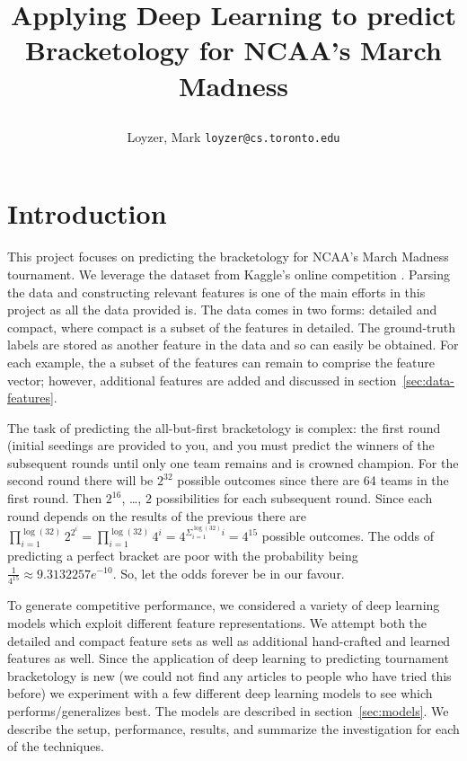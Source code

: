 \documentclass{article} %
\begin{document}
\title{Applying Deep Learning to predict Bracketology for NCAA's March Madness
\author{Loyzer, Mark \texttt{loyzer@cs.toronto.edu}}
}





\newcommand{\fix}{\marginpar{FIX}}
\newcommand{\new}{\marginpar{NEW}}


\maketitle

\section{Introduction}
This project focuses on predicting the bracketology for NCAA's March Madness tournament.  We leverage the dataset from Kaggle's online competition \citep{kagglecompetition}.  Parsing the data and constructing relevant features is one of the main efforts in this project as all the data provided is.  The data comes in two forms: detailed and compact, where compact is a subset of the features in detailed.  The ground-truth labels are stored as another feature in the data and so can easily be obtained.  For each example, the a subset of the features can remain to comprise the feature vector; however, additional features are added and discussed in section~\ref{sec:data-features}.


The task of predicting the all-but-first bracketology is complex: the first round (initial seedings are provided to you, and you must predict the winners of the subsequent rounds until only one team remains and is crowned champion.  For the second round there will be $2^{32}$ possible outcomes since there are 64 teams in the first round.  Then $2^{16}$, \dots, $2$ possibilities for each subsequent round.  Since each round depends on the results of the previous there are $\prod_{i=1}^{\log(32)} 2^{2^{i}} = \prod_{i=1}^{\log(32)} 4^{i} = 4^{\Sigma_{i=1}^{\log(32)} i} = 4^{15}$ possible outcomes.   The odds of predicting a perfect bracket are poor with the probability being $\frac{1}{4^{15}} \approx 9.3132257e^{-10}$.  So, let the odds forever be in our favour.


To generate competitive performance, we considered a variety of deep learning models which exploit different feature representations.  We attempt both the detailed and compact feature sets as well as additional hand-crafted and learned features as well.  Since the application of deep learning to predicting tournament bracketology is new (we could not find any articles to people who have tried this before) we experiment with a few different deep learning models to see which performs/generalizes best.  The models are described in section~\ref{sec:models}.  We describe the setup, performance, results, and summarize the investigation for each of the techniques.
\end{document}
